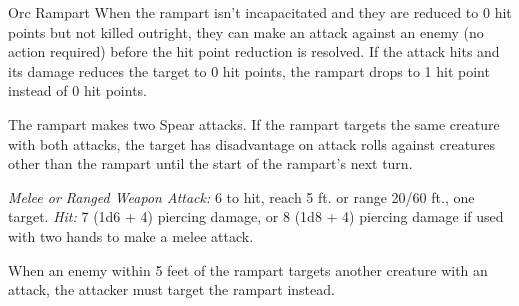 \documentclass[10pt,a4paper,twoside,bg=print,twocolumn,openany,nodeprecatedcode]{dndbook}
\begin{document}
\begin{DndMonster}[float=t]{Orc Rampart}
\DndMonsterBasics[
armor-class = {18 (\textit{chain mail})},
hit-points = {\DndDice{5d8 + 20}},
speed = {35 ft.}
]
\DndMonsterAbilityScores[
 str = 18,
 dex = 12,
 con = 18,
 int = 10,
 wis = 11,
 cha = 12
]
\DndMonsterDetails[
skills = {Athletics +6, Perception +2},
senses = {darkvision 60 ft., passive perception 12},
languages = {Common, Orc},
challenge = 2,
]
When the rampart isn't incapacitated and they are reduced to 0 hit points but not killed outright, they can make an attack against an enemy (no action required) before the hit point reduction is resolved. If the attack hits and its damage reduces the target to 0 hit points, the rampart drops to 1 hit point instead of 0 hit points.

The rampart makes two Spear attacks. If the rampart targets the same creature with both attacks, the target has disadvantage on attack rolls against creatures other than the rampart until the start of the rampart's next turn.

\textsl{Melee or Ranged Weapon Attack:} 6 to hit, reach 5 ft. or range 20/60 ft., one target. \textsl{Hit:} 7 (1d6 + 4) piercing damage, or 8 (1d8 + 4) piercing damage if used with two hands to make a melee attack.

When an enemy within 5 feet of the rampart targets another creature with an attack, the attacker must target the rampart instead.

\end{DndMonster}
\end{document}
